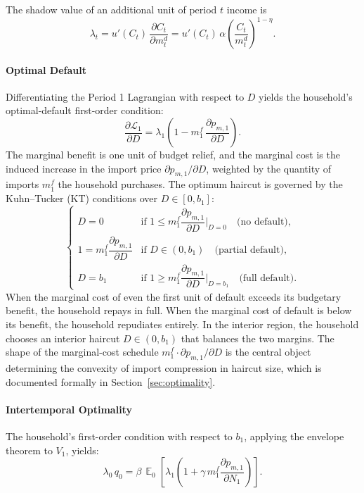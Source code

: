\documentclass[11pt]{article}
\DeclareMathOperator{\E}{\mathbb{E}}
\theoremstyle{definition}
\theoremstyle{plain}
\theoremstyle{remark}
\newcommand{\mf}{m^{f}}
\newcommand{\md}{m^{d}}
\begin{document}
The shadow value of an additional unit of period $t$ income is
\begin{equation}\label{eq:shadow}
\lambda_t = u'(C_t)\,\frac{\partial C_t}{\partial \md_t} = u'(C_t)\,\alpha\!\left(\frac{C_t}{\md_t}\right)^{\!1-\eta}.
\end{equation}

\paragraph{Optimal Default}

Differentiating the Period 1 Lagrangian with respect to $D$ yields the household's optimal-default first-order condition:
\begin{equation}\label{eq:foc_D}
\frac{\partial \mathcal{L}_1}{\partial D} = \lambda_1\!\left(1 - \mf_1\, \frac{\partial p_{m,1}}{\partial D}\right).
\end{equation}
The marginal benefit is one unit of budget relief, and the marginal cost is the induced increase in the import price $\partial p_{m,1}/\partial D$, weighted by the quantity of imports $\mf_1$ the household purchases. The optimum haircut is governed by the Kuhn–Tucker (KT) conditions over $D \in [0, b_1]$:
\begin{equation}\label{eq:KT}
\begin{cases}
D = 0 & \text{if } 1 \leq \mf_1 \dfrac{\partial p_{m,1}}{\partial D}\bigg|_{D=0} \quad \text{(no default)},\\[10pt]
1 = \mf_1 \dfrac{\partial p_{m,1}}{\partial D} & \text{if } D \in (0, b_1) \quad \text{(partial default)},\\[10pt]
D = b_1 & \text{if } 1 \geq \mf_1 \dfrac{\partial p_{m,1}}{\partial D}\bigg|_{D=b_1} \quad \text{(full default)}.
\end{cases}
\end{equation}
When the marginal cost of even the first unit of default exceeds its budgetary benefit, the household repays in full. When the marginal cost of default is below its benefit, the household repudiates entirely. In the interior region, the household chooses an interior haircut $D \in (0, b_1)$ that balances the two margins. The shape of the marginal-cost schedule $\mf_1 \cdot \partial p_{m,1}/\partial D$ is the central object determining the convexity of import compression in haircut size, which is documented formally in Section~\ref{sec:optimality}.

\paragraph{Intertemporal Optimality}
The household's first-order condition with respect to $b_1$, applying the envelope theorem to $V_1$, yields:
\begin{equation}\label{eq:euler}
\lambda_0\, q_0 = \beta\,\E_0\!\left[\lambda_1\!\left(1 + \gamma\,\mf_1 \frac{\partial p_{m,1}}{\partial N_1}\right)\right].
\end{equation}
\end{document}
